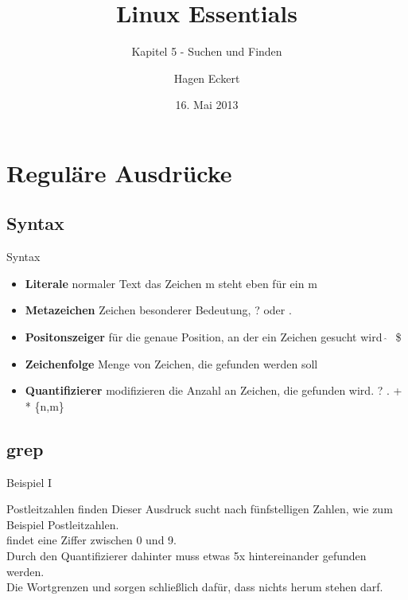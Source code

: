 \documentclass[aspectratio=43]{beamer}
\title[Linux Essentials  - Kapitel 5 - Suchen und Finden]{Linux Essentials}
\subtitle{Kapitel 5 - Suchen und Finden}
\author{Hagen Eckert}
\date{16. Mai 2013}
\begin{document}
\logoframe

\frame{\titlepage}

\setcounter{tocdepth}{1}
\section[Gliederung]{}
\frame{\tableofcontents}

\section{Reguläre Ausdrücke}
\subsection{Syntax}
\begin{frame} 
	\begin{block}{Syntax} 
	\begin{itemize}
	\item \textbf{Literale} normaler Text
	\newline  das Zeichen m steht eben für ein m 
	\item \textbf{Metazeichen} Zeichen besonderer Bedeutung, 
	\newline ? oder .
	\item \textbf{Positonszeiger} für die genaue Position, an der ein Zeichen gesucht wird
	\newline  $\hat{\;}\;$ \$
	\item \textbf{Zeichenfolge} Menge von Zeichen, die gefunden werden soll
	\item \textbf{Quantifizierer} modifizieren die Anzahl an Zeichen, die gefunden wird.
	\newline  ? . + * \{n,m\}
	\end{itemize}
	\end{block}


\end{frame}


\subsection{grep}
\begin{frame} 
	\begin{exampleblock}{Beispiel I}
	\end{exampleblock}

	\begin{block}{Postleitzahlen finden} 
Dieser Ausdruck sucht nach fünfstelligen Zahlen, wie zum Beispiel Postleitzahlen. \\
\co{[0-­9]} findet eine Ziffer zwischen 0 und 9. \\
Durch den Quantifizierer  dahinter muss etwas 5x hintereinander gefunden werden. \\
Die Wortgrenzen \co{\textbackslash$<$} und \co{\textbackslash$>$} sorgen schließlich dafür, dass nichts herum stehen darf.
	\end{block}	
\end{frame}
\end{document}
